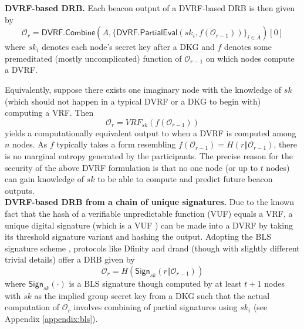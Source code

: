 \documentclass[letterpaper,twocolumn,10pt]{article}
\theoremstyle{definition}
\theoremstyle{remark}
\begin{document}
\noindent\textbf{DVRF-based DRB.} Each beacon output of a DVRF-based DRB is then given by
\begingroup\makeatletter\def\f@size{8}\check@mathfonts
\[
\mathcal{O}_r = \mathsf{DVRF.Combine}(A, \{\mathsf{DVRF.PartialEval}(sk_i, f(\mathcal{O}_{r - 1}))\}_{i \in A})[0]
\]\endgroup
where $sk_i$ denotes each node's secret key after a DKG and $f$ denotes some premeditated (mostly uncomplicated) function of $\mathcal{O}_{r - 1}$ on which nodes compute a DVRF.

Equivalently, suppose there exists one imaginary node with the knowledge of $sk$ (which should not happen in a typical DVRF or a DKG to begin with) computing a VRF. Then
\[
\mathcal{O}_r = VRF_{sk}(f(\mathcal{O}_{r - 1}))
\]
yields a computationally equivalent output to when a DVRF is computed among $n$ nodes. As $f$ typically takes a form resembling $f(\mathcal{O}_{r - 1}) = H(r \mathbin\Vert \mathcal{O}_{r - 1})$, there is no marginal entropy generated by the participants. The precise reason for the security of the above DVRF formulation is that no one node (or up to $t$ nodes) can gain knowledge of $sk$ to be able to compute and predict future beacon outputs.\\

\noindent\textbf{DVRF-based DRB from a chain of unique signatures.} Due to the known fact that the hash of a verifiable unpredictable function (VUF) \cite{micali1999verifiable} equals a VRF, a unique digital signature (which is a VUF \cite{dodis2005verifiable}) can be made into a DVRF by taking its threshold signature variant \cite{boldyreva2003threshold} and hashing the output. Adopting the BLS signature scheme \cite{boneh2001short}, protocols like Dfinity \cite{hanke2018dfinity} and drand \cite{drand} (though with slightly different trivial details) offer a DRB given by
\[
\mathcal{O}_r = H(\mathsf{Sign}_{sk}(r \mathbin\Vert \mathcal{O}_{r - 1}))
\]
where $\mathsf{Sign}_{sk}(\cdot)$ is a BLS signature though computed by at least $t + 1$ nodes with $sk$ as the implied group secret key from a DKG such that the actual computation of $\mathcal{O}_r$ involves combining of partial signatures using $sk_i$ (see Appendix \ref{appendix:bls}).\\
\end{document}
